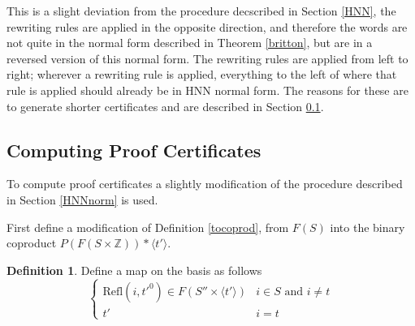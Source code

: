 \documentclass[11pt]{article} %
\theoremstyle{definition}
\theoremstyle{definition}
\theoremstyle{definition}
\theoremstyle{definition}
\theoremstyle{definition}
\newtheorem{defn}[theorem]{Definition}
\theoremstyle{definition}
\begin{document}
This is a slight deviation from the procedure decscribed in
Section \ref{HNN}, the rewriting rules are applied in the opposite direction, and therefore
the words are not quite in the normal form described in Theorem \ref{britton}, but are in a reversed
version of this normal form.  The rewriting rules are applied from left to right; wherever a rewriting rule
is applied, everything to the left of where that rule is applied should already be in
HNN normal form. The reasons for these are to generate shorter certificates and are described
in Section \ref{HNNPC}.



\subsection{Computing Proof Certificates}\label{HNNPC}

To compute proof certificates a slightly modification of the procedure described in Section
\ref{HNNnorm} is used.

First define a modification of Definition \ref{tocoprod}, from $F(S)$ into the binary
coproduct $P(F(S \times \mathbb{Z})) \ast \langle t' \rangle$.

\begin{defn}\label{tocoprodP}
  Define a map on the basis as follows
  \begin{equation}
    \begin{cases}
      \text{Refl}(i, t'^0) \in F(S'' \times \langle t' \rangle) & i \in S \text{ and } i \ne t \\
      t' & i = t
    \end{cases}
  \end{equation}
\end{defn}
\end{document}
